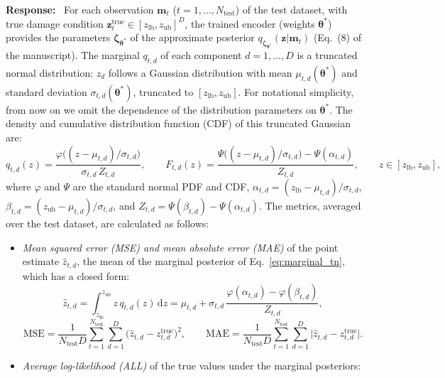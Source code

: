 \documentclass[11pt]{article}
\newenvironment{response}{\par\smallskip\noindent\color{resp}\textbf{Response:}\ }{\par}
\newcommand{\m}{\mathbf{m}}
\newcommand{\z}{\mathbf{z}}
\begin{document}
\begin{response}
For each observation $\m_t$ ($t=1,\dots,N_{\text{test}}$) of the test dataset, with true damage condition
$\z^{\text{true}}_t\in[z_{\text{lb}},z_{\text{ub}}]^{D}$, the trained encoder (weights $\bm{\theta}^{*}$) provides the parameters $\bm\zeta_{\bm{\theta}^{*}}$ of the approximate posterior $q_{\bm\zeta_{\bm{\theta}^{*}}}(\z|\m_t)$ (Eq.~(8) of the manuscript). The marginal $q_{t,d}$ of each component $d=1,\dots,D$ is a truncated normal distribution: $z_d$ follows a Gaussian distribution with mean $\mu_{t,d}(\bm{\theta}^{*})$ and standard deviation $\sigma_{t,d}(\bm{\theta}^{*})$, truncated to $[z_{\text{lb}},z_{\text{ub}}]$. 
For notational simplicity, from now on we omit the dependence of the distribution parameters on $\bm{\theta}^{*}$. 
The density and cumulative distribution function
(CDF) of this truncated Gaussian are:
\begin{equation}
	q_{t,d}(z)=\frac{\varphi\big((z-\mu_{t,d})/\sigma_{t,d}\big)}{\sigma_{t,d}\,Z_{t,d}},\qquad
	F_{t,d}(z)=\frac{\Psi\big((z-\mu_{t,d})/\sigma_{t,d}\big)-\Psi(\alpha_{t,d})}{Z_{t,d}},\qquad
	z\in[z_{\text{lb}},z_{\text{ub}}],
	\label{eq:marginal_tn}
\end{equation}
where $\varphi$ and $\Psi$ are the standard normal PDF and CDF, $\alpha_{t,d}=(z_{\text{lb}}-\mu_{t,d})/\sigma_{t,d}$,
$\beta_{t,d}=(z_{\text{ub}}-\mu_{t,d})/\sigma_{t,d}$, and $Z_{t,d}=\Psi(\beta_{t,d})-\Psi(\alpha_{t,d})$. %
The metrics, averaged over the test dataset, are calculated as follows:
\begin{itemize}[leftmargin=*]
	\item \emph{Mean squared error (MSE) and mean absolute error (MAE)} of the point estimate $\hat z_{t,d}$, the mean of
	the marginal posterior of Eq.~\eqref{eq:marginal_tn}, which has a closed form:
	\begin{equation*}
		\hat z_{t,d}=\int_{z_{\text{lb}}}^{z_{\text{ub}}} z\,q_{t,d}(z)\,\mathrm{d}z
		=\mu_{t,d}+\sigma_{t,d}\,\frac{\varphi(\alpha_{t,d})-\varphi(\beta_{t,d})}{Z_{t,d}},
	\end{equation*}
	\begin{equation}
		\mathrm{MSE}=\frac{1}{N_{\text{test}}D}\sum_{t=1}^{N_{\text{test}}}\sum_{d=1}^{D}\big(\hat z_{t,d}-z^{\text{true}}_{t,d}\big)^2,\qquad
		\mathrm{MAE}=\frac{1}{N_{\text{test}}D}\sum_{t=1}^{N_{\text{test}}}\sum_{d=1}^{D}\big|\hat z_{t,d}-z^{\text{true}}_{t,d}\big|.
		\label{eq:mse_mae}
	\end{equation}
	\item \emph{Average log-likelihood (ALL)} of the true values under the marginal posteriors:

\end{itemize}
\end{response}
\end{document}
